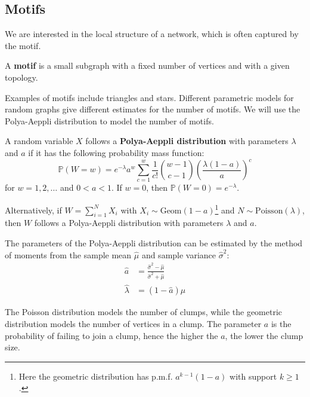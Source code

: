 \documentclass{article}
\begin{document}
\subsection{Motifs}

We are interested in the local structure of a network, which is often captured by the motif.
\begin{definition}
    A \textbf{motif} is a small subgraph with a fixed number of vertices and with
    a given topology.
\end{definition}

Examples of motifs include triangles and stars. Different parametric models for random graphs give different estimates for the number of motifs. We will use the Polya-Aeppli distribution to model the number of motifs.  

\begin{definition}
    A random variable $X$ follows a \textbf{Polya-Aeppli distribution} with parameters $\lambda$ and $a$ if it has the following probability mass function:
    \begin{equation*}
        \mathbb{P}(W=w)=e^{-\lambda}a^{w}\sum_{c=1}^{w}\frac{1}{c!}\binom{w-1}{c-1}\left(\frac{\lambda(1-a)}{a}\right)^{c}
    \end{equation*}
    for $w=1,2,\ldots$ and $0<a<1$. If $w=0$, then $\mathbb{P}(W=0)=e^{-\lambda}$.
\end{definition}

Alternatively, if $W=\sum_{i=1}^{N}X_{i}$ with $X_{i}\sim\mathrm{Geom}(1-a)$\footnote{Here the geometric distribution has p.m.f. $a^{k-1}(1-a)$ with support $k\geq 1$. } and $N\sim \mathrm{Poisson}(\lambda)$, then $W$ follows a Polya-Aeppli distribution with parameters $\lambda$ and $a$.  

The parameters of the Polya-Aeppli distribution can be estimated by the method of moments from the sample mean $\hat{\mu}$ and sample variance $\hat{\sigma}^2$:
\begin{align*}
    \hat{a} &= \frac{\hat{\sigma}^2 - \hat{\mu}}{\hat{\sigma}^2+\hat{\mu}}\\
    \hat{\lambda} &= (1-\hat{a})\hat{\mu}
\end{align*}

\begin{remark}
    The Poisson distribution models the number of clumps, while the geometric distribution models the number of vertices in a clump. The parameter $a$ is the probability of failing to join a clump, hence the higher the $a$, the lower the clump size.  
\end{remark}
\end{document}
